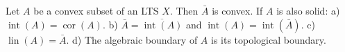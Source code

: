 Let $A$ be a convex subset of an LTS $X$. Then $\bar{A}$ is convex. If $A$ is also solid: a) $\operatorname{int}(A) = \operatorname{cor}(A)$. b) $\bar{A} = \overline{\operatorname{int}(A)}$ and $\operatorname{int}(A) = \operatorname{int}(\bar{A})$. c) $\operatorname{lin}(A) = \bar{A}$. d) The algebraic boundary of $A$ is its topological boundary.